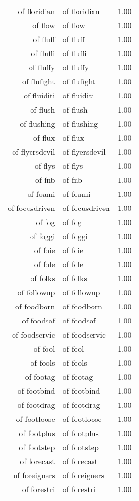 \begin{table}[ht]
\begin{tabular}{rlr}
  of floridian & of floridian & 1.00 \\ 
  of flow & of flow & 1.00 \\ 
  of fluff & of fluff & 1.00 \\ 
  of fluffi & of fluffi & 1.00 \\ 
  of fluffy & of fluffy & 1.00 \\ 
  of flufight & of flufight & 1.00 \\ 
  of fluiditi & of fluiditi & 1.00 \\ 
  of flush & of flush & 1.00 \\ 
  of flushing & of flushing & 1.00 \\ 
  of flux & of flux & 1.00 \\ 
  of flyersdevil & of flyersdevil & 1.00 \\ 
  of flys & of flys & 1.00 \\ 
  of fnb & of fnb & 1.00 \\ 
  of foami & of foami & 1.00 \\ 
  of focusdriven & of focusdriven & 1.00 \\ 
  of fog & of fog & 1.00 \\ 
  of foggi & of foggi & 1.00 \\ 
  of foie & of foie & 1.00 \\ 
  of fole & of fole & 1.00 \\ 
  of folks & of folks & 1.00 \\ 
  of followup & of followup & 1.00 \\ 
  of foodborn & of foodborn & 1.00 \\ 
  of foodsaf & of foodsaf & 1.00 \\ 
  of foodservic & of foodservic & 1.00 \\ 
  of fool & of fool & 1.00 \\ 
  of fools & of fools & 1.00 \\ 
  of footag & of footag & 1.00 \\ 
  of footbind & of footbind & 1.00 \\ 
  of footdrag & of footdrag & 1.00 \\ 
  of footloose & of footloose & 1.00 \\ 
  of footplus & of footplus & 1.00 \\ 
  of footstep & of footstep & 1.00 \\ 
  of forecast & of forecast & 1.00 \\ 
  of foreigners & of foreigners & 1.00 \\ 
  of forestri & of forestri & 1.00 \\ 

\end{tabular}
\end{table}
